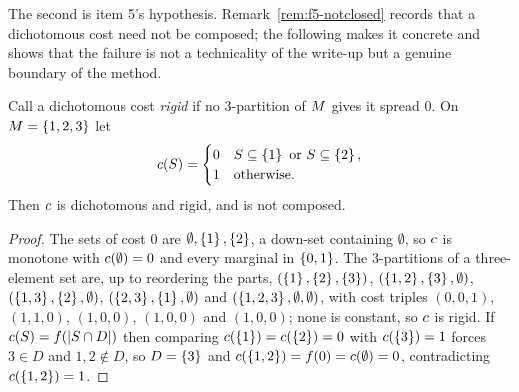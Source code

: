 The second is item 5's hypothesis. Remark~\ref{rem:f5-notclosed} records that a
dichotomous cost need not be composed; the following makes it concrete and shows
that the failure is not a technicality of the write-up but a genuine boundary of
the method.

\begin{proposition}
\label{prop:f5-noncomposed}
Call a dichotomous cost \emph{rigid} if no $3$-partition of $M$ gives it
spread $0$. On $M = \left\{1,2,3\right\}$ let
\[
  c(S) = \begin{cases} 0 & S \subseteq \left\{1\right\} \text{ or } S \subseteq \left\{2\right\},\\
  1 & \text{otherwise.}\end{cases}
\]
Then $c$ is dichotomous and rigid, and is not composed.
\end{proposition}

\begin{proof}
The sets of cost $0$ are $\emptyset, \left\{1\right\}, \left\{2\right\}$, a down-set containing
$\emptyset$, so $c$ is monotone with $c(\emptyset) = 0$ and every
marginal in $\left\{0,1\right\}$. The $3$-partitions of a three-element set are, up to
reordering the parts, $(\left\{1\right\},\left\{2\right\},\left\{3\right\})$,
$(\left\{1,2\right\},\left\{3\right\},\emptyset)$, $(\left\{1,3\right\},\left\{2\right\},\emptyset)$,
$(\left\{2,3\right\},\left\{1\right\},\emptyset)$ and $(\left\{1,2,3\right\},\emptyset,\emptyset)$, with
cost triples $(0,0,1)$, $(1,1,0)$, $(1,0,0)$, $(1,0,0)$ and $(1,0,0)$; none is
constant, so $c$ is rigid. If $c(S) = f(\left\lvert S \cap D\right\rvert)$ then comparing
$c(\left\{1\right\}) = c(\left\{2\right\}) = 0$ with $c(\left\{3\right\}) = 1$ forces
$3 \in D$ and $1,2 \notin D$, so $D = \left\{3\right\}$ and
$c(\left\{1,2\right\}) = f(0) = c(\emptyset) = 0$, contradicting
$c(\left\{1,2\right\}) = 1$.
\end{proof}


